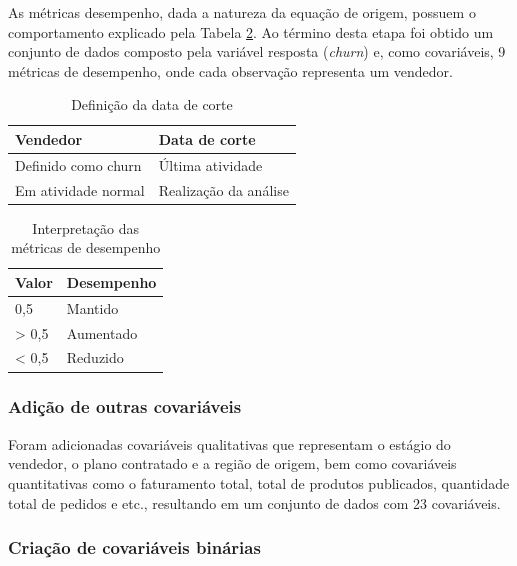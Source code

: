 \documentclass[twocolumn]{rbef}
\newcommand{\1}{\mathbbm{1}}
\begin{document}
As métricas desempenho, dada a natureza da equação de origem, possuem o comportamento explicado pela Tabela \ref{tab:metricas}. Ao término desta etapa foi obtido um conjunto de dados composto pela variável resposta (\textit{churn}) e, como covariáveis, 9 métricas de desempenho, onde cada observação representa um vendedor.

\begin{table}

\caption{\label{tab:dataDeCorte}Definição da data de corte}
\centering
\fontsize{9}{11}\selectfont
\begin{tabular}[t]{ll}
\toprule
Vendedor & Data de corte\\
\midrule
Definido como churn & Última atividade\\
Em atividade normal & Realização da análise\\
\bottomrule
\end{tabular}
\end{table}

\begin{table}

\caption{\label{tab:metricas}Interpretação das métricas de desempenho}
\centering
\fontsize{9}{11}\selectfont
\begin{tabular}[t]{ll}
\toprule
Valor & Desempenho\\
\midrule
0,5 & Mantido\\
> 0,5 & Aumentado\\
< 0,5 & Reduzido\\
\bottomrule
\end{tabular}
\end{table}

\hypertarget{adiuxe7uxe3o-de-outras-covariuxe1veis}{%
\subsubsection{Adição de outras covariáveis}\label{adiuxe7uxe3o-de-outras-covariuxe1veis}}

Foram adicionadas covariáveis qualitativas que representam o estágio do vendedor, o plano contratado e a região de origem, bem como covariáveis quantitativas como o faturamento total, total de produtos publicados, quantidade total de pedidos e etc., resultando em um conjunto de dados com 23 covariáveis.

\hypertarget{criauxe7uxe3o-de-covariuxe1veis-binuxe1rias}{%
\subsubsection{Criação de covariáveis binárias}\label{criauxe7uxe3o-de-covariuxe1veis-binuxe1rias}}
\end{document}
